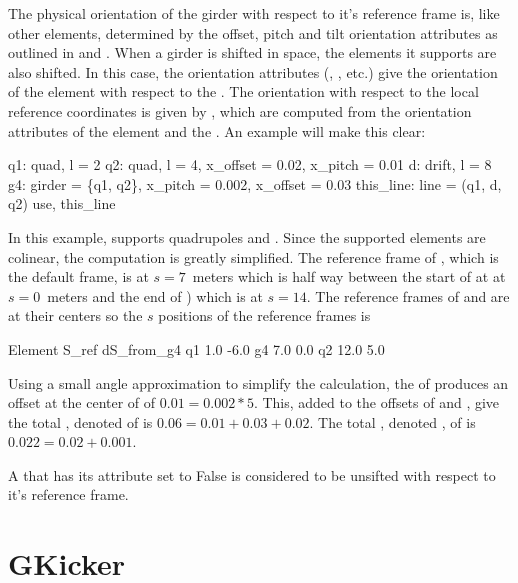 The physical orientation of the girder with respect to it's reference
frame is, like other elements, determined by the offset, pitch and
tilt orientation attributes as outlined in  and
.  When a girder is shifted in space, the elements
it supports are also shifted.  In this case, the orientation
attributes (, , etc.) give the orientation of
the element with respect to the . The orientation with
respect to the local reference coordinates is given by
, which are computed from the orientation attributes
of the element and the . An example will make this clear:
\begin{example}
  q1: quad, l = 2
  q2: quad, l = 4, x_offset = 0.02, x_pitch = 0.01
  d: drift, l = 8
  g4: girder = \{q1, q2\}, x_pitch = 0.002, x_offset = 0.03
  this_line: line = (q1, d, q2)
  use, this_line
\end{example}
In this example,  supports quadrupoles  and .
Since the supported elements are colinear, the computation is greatly
simplified. The reference frame of , which is the default
 frame, is at $s = 7$~meters which is half way between the
start of  at at $s = 0$~meters and the end of ) which is
at $s = 14$. The reference frames of  and  are at their
centers so the $s$ positions of the reference frames is
\begin{example}
  Element        S_ref   dS_from_g4
  q1             1.0     -6.0
  g4             7.0      0.0
  q2            12.0      5.0
\end{example}
Using a small angle approximation to simplify the calculation, the  of  produces
an offset at the center of  of $0.01 = 0.002 * 5$. This, added to the offsets of  and
, give the total , denoted  of  is $0.06 = 0.01 + 0.03 +
0.02$. The total , denoted , of  is $0.022 = 0.02 + 0.001$.

A  that has its  attribute set to False is considered to be unsifted with
respect to it's reference frame.

\newpage

\section{GKicker}
\label{s:gkicker}

